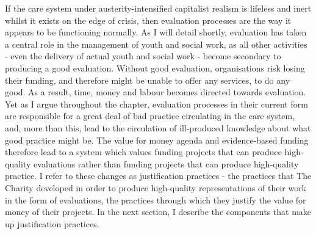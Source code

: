 If the care system under austerity-intensified capitalist realism is lifeless and inert whilst it exists on the edge of crisis, then evaluation processes are the way it appears to be functioning normally. As I will detail shortly, evaluation has taken a central role in the management of youth and social work, as all other activities - even the delivery of actual youth and social work - become secondary to producing a good evaluation. Without good evaluation, organisations risk losing their funding, and therefore might be unable to offer any services, to do any good. As a result, time, money and labour becomes directed towards evaluation. Yet as I argue throughout the chapter, evaluation processes in their current form are responsible for a great deal of bad practice circulating in the care system, and, more than this, lead to the circulation of ill-produced knowledge about what good practice might be. The value for money agenda and evidence-based funding therefore lead to a system which values funding projects that can produce high-quality evaluations rather than funding projects that can produce high-quality practice. I refer to these changes as justification practices - the practices that The Charity developed in order to produce high-quality representations of their work in the form of evaluations, the practices through which they justify the value for money of their projects. In the next section, I describe the components that make up justification practices.

